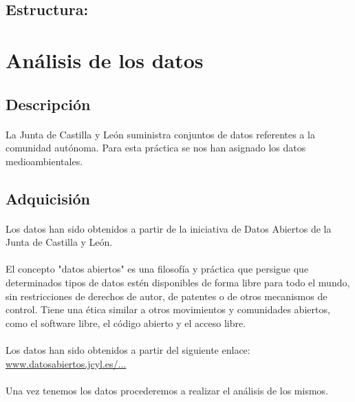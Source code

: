 \documentclass{article}
\begin{document}
		\subsection{Estructura:}

	\section{Análisis de los datos}

		\subsection{Descripción}
			\paragraph{}
			La Junta de Castilla y León suministra conjuntos de datos referentes a la comunidad autónoma. Para esta práctica se nos han asignado los datos medioambientales. 

		\subsection{Adquicisión}
			\paragraph{}
			Los datos han sido obtenidos a partir de la iniciativa de Datos Abiertos de la Junta de Castilla y León. 		
			\paragraph{}
			El concepto "datos abiertos" es una filosofía y práctica que persigue que determinados tipos de datos estén disponibles de forma libre para todo el mundo, sin restricciones de derechos de autor, de patentes o de otros mecanismos de control. Tiene una ética similar a otros movimientos y comunidades abiertos, como el software libre, el código abierto y el acceso libre.
			
			\paragraph{}
			Los datos han sido obtenidos a partir del siguiente enlace: \href{http://www.datosabiertos.jcyl.es/web/jcyl/set/es/mediciones/indicadoresambientales/1284227444931}{www.datosabiertos.jcyl.es/...}
			
			\paragraph{}
			Una vez tenemos los datos procederemos a realizar el análisis de los mismos.
\end{document}
